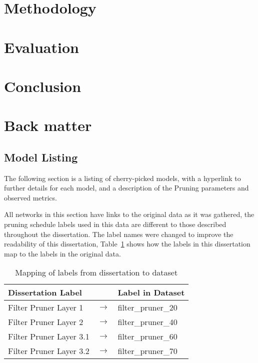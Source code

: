 \documentclass[11pt]{article}
\begin{document}
\newpage



\section{Methodology}



\section{Evaluation}


\section{Conclusion}


\newpage
\appendix
\section{Back matter}
\subsection{Model Listing}
The following section is a listing of cherry-picked models, with a hyperlink to further details for each model, and a description of the Pruning parameters and observed metrics.

All networks in this section have links to the original data as it was gathered, the pruning schedule labels used in this data are different to those described throughout the dissertation. 
The label names were changed to improve the readability of this dissertation, Table~\ref{tab:labelMapping} shows how the labels in this dissertation map to the labels in the original data. 


\begin{table}[H]
    \centering
    \begin{tabular}{@{}lll@{}}
    \toprule
    \textbf{Dissertation Label} &                & \textbf{Label in Dataset} \\ \hline
    Filter Pruner Layer 1       & $\rightarrow$ & filter\_pruner\_20        \\
    Filter Pruner Layer 2       & $\rightarrow$ & filter\_pruner\_40        \\
    Filter Pruner Layer 3.1     & $\rightarrow$ & filter\_pruner\_60        \\
    Filter Pruner Layer 3.2     & $\rightarrow$ & filter\_pruner\_70        \\ \hline
    \end{tabular}
    \caption{Mapping of labels from dissertation to dataset}
    \label{tab:labelMapping}
\end{table}
\end{document}
